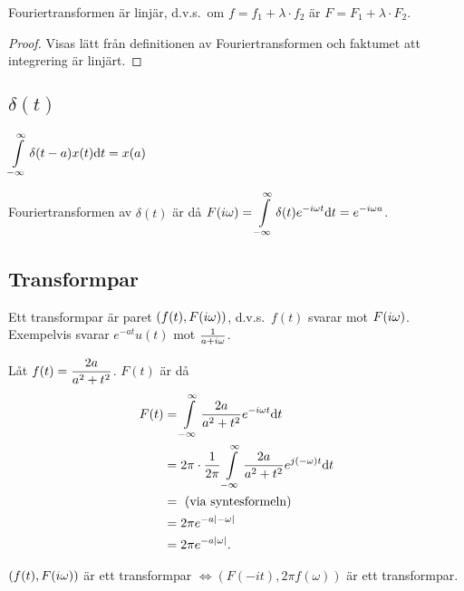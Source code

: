 \documentclass[a4paper]{article}
\begin{document}
\begin{sats}
    Fouriertransformen är linjär, d.v.s.\ om \(
        f = f_1 + \lambda \cdot f_2 
    \) är \(
        F = F_1 + \lambda \cdot F_2
    \).

    \begin{proof}
        Visas lätt från definitionen av Fouriertransformen och faktumet att 
        integrering är linjärt.
    \end{proof}
\end{sats}

\subsection{\(
    \delta(t)
\) }

\(
    \displaystyle\int\limits_{-\infty}^{\infty} \delta(t-a) x(t) \dd t = x(a)
\) 

Fouriertransformen av \(
    \delta(t)
\) är då \(
    F(i\omega) = \displaystyle\int\limits_{-\infty}^{\infty} \delta(t) e^{-i\omega t} \dd t
    = e^{-i\omega a}
\).

\subsection{Transformpar}
Ett transformpar är paret \(
    (f(t), F(i\omega))
\), d.v.s.\ \(
    f(t)
\) svarar mot \(
    F(i\omega)
\). Exempelvis svarar \(
    e^{-at}u(t)
\) mot \(
    \frac{1}{a+i\omega}
\).

\begin{ex}
    Låt \(
        f(t) = \displaystyle\frac{2a}{a^2+t^2} 
    \). \(
        F(t)
    \) är då 
    \begin{align*}
        F(t) &= \displaystyle\int\limits_{-\infty}^{\infty} \displaystyle\frac{2a}{a^2+t^2} e^{-i\omega t} \dd t \\
        &= 2\pi \cdot \frac{1}{2\pi} \displaystyle\int\limits_{-\infty}^{\infty} \displaystyle\frac{2a}{a^2+t^2} e^{j(-\omega)t} \dd t\\
        &= \text{ (via syntesformeln) } \\
        &= 2\pi e^{-a\abs{-\omega}} \\
        &= 2\pi e^{-a\abs{\omega}}.
    \end{align*}
\end{ex}


\begin{påst}
    \(
        (f(t), F(i\omega))
    \) är ett transformpar \(
        \iff (F(-it), 2\pi f(\omega))
    \) är ett transformpar.
\end{påst}
\end{document}
